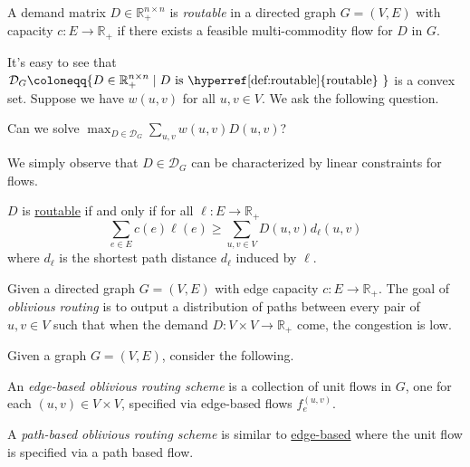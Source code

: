 \begin{definition}[Routable]\label{def:routable}
	A demand matrix \(D \in \mathbb{R} _+^{n \times n}\) is \emph{routable} in a directed graph \(G = (V, E)\) with capacity \(c \colon E \to \mathbb{R} _+\) if there exists a feasible multi-commodity flow for \(D\) in \(G\).
\end{definition}

It's easy to see that \(\mathcal{D} _G \coloneqq \{ D \in \mathbb{R} _+^{n \times n} \mid D \text{ is \hyperref[def:routable]{routable} } \} \) is a convex set. Suppose we have \(w(u, v)\) for all \(u, v \in V\). We ask the following question.

\begin{problem}\label{prb:optimize-demand-polytope}
Can we solve \(\max _{D \in \mathcal{D} _G} \sum_{u, v} w(u, v) D(u, v)\)?
\end{problem}
\begin{answer}
	We simply observe that \(D \in \mathcal{D} _G\) can be characterized by linear constraints for flows.
\end{answer}

\begin{lemma}
	\(D\) is \hyperref[def:routable]{routable} if and only if for all \(\ell \colon E \to \mathbb{R} _+\)
	\[
		\sum_{e \in E} c(e) \ell (e) \geq \sum_{u, v \in V} D(u, v) d_{\ell } (u, v)
	\]
	where \(d_{\ell } \) is the shortest path distance \(d_{\ell } \) induced by \(\ell \).
\end{lemma}


\begin{problem}\label{def:oblivious-routing}
Given a directed graph \(G = (V, E)\) with edge capacity \(c \colon E \to \mathbb{R} _+\). The goal of \emph{oblivious routing} is to output a distribution of paths between every pair of \(u, v \in V\) such that when the demand \(D \colon V \times V \to \mathbb{R} _+\) come, the congestion is low.
\end{problem}

\begin{definition}\label{def:oblivious-routing-scheme}
	Given a graph \(G = (V, E)\), consider the following.
	\begin{definition}\label{def:edge-based-oblivious-routing-scheme}
		An \emph{edge-based oblivious routing scheme} is a collection of unit flows in \(G\), one for each \((u, v) \in V \times V\), specified via edge-based flows \(f_e^{(u, v)}\).
	\end{definition}

	\begin{definition}\label{def:path-based-oblivious-routing-scheme}
		A \emph{path-based oblivious routing scheme} is similar to \hyperref[def:edge-based-oblivious-routing-scheme]{edge-based} where the unit flow is specified via a path based flow.
	\end{definition}
\end{definition}


